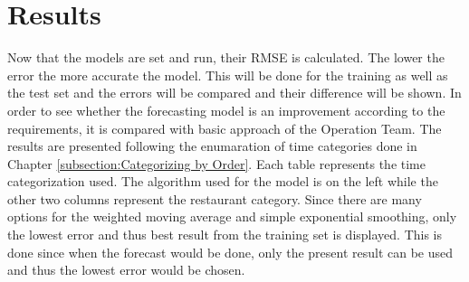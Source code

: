 \chapter{Results}\label{chapter:Results}
Now that the models are set and run, their RMSE is calculated. The lower the error the more accurate the model. This will be done for the training as well as the test set and the errors will be compared and their difference will be shown. \newline
In order to see whether the forecasting model is an improvement according to the requirements, it is compared with basic approach of the Operation Team.\newlone
The results are presented following the enumaration of time categories done in Chapter \ref{subsection:Categorizing by Order}. Each table represents the time categorization used. The algorithm used for the model is on the left while the other two columns represent the restaurant category. Since there are many options for the weighted moving average and simple exponential smoothing, only the lowest error and thus best result from the training set is displayed. This is done since when the forecast would be done, only the present result can be used and thus the lowest error would be chosen.\newline
